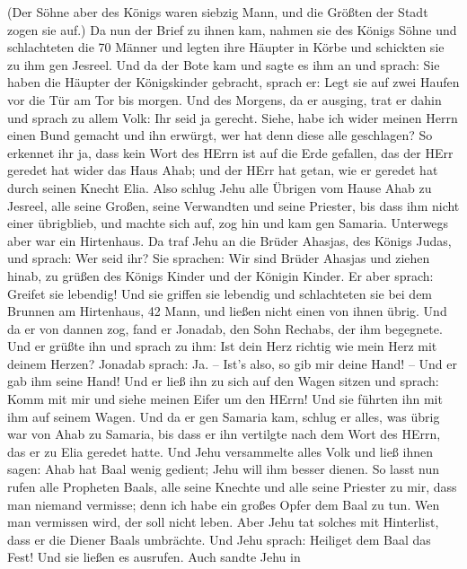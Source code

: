 (Der Söhne aber des Königs waren siebzig Mann, und die Größten der Stadt
zogen sie auf.)  Da nun der Brief zu ihnen kam, nahmen sie
des Königs Söhne und schlachteten die 70 Männer und legten ihre Häupter
in Körbe und schickten sie zu ihm gen Jesreel.  Und da der
Bote kam und sagte es ihm an und sprach: Sie haben die Häupter der
Königskinder gebracht, sprach er: Legt sie auf zwei Haufen vor die Tür
am Tor bis morgen.  Und des Morgens, da er ausging, trat er
dahin und sprach zu allem Volk: Ihr seid ja gerecht. Siehe, habe ich
wider meinen Herrn einen Bund gemacht und ihn erwürgt, wer hat denn
diese alle geschlagen?  So erkennet ihr ja, dass kein Wort
des HErrn ist auf die Erde gefallen, das der HErr geredet hat wider das
Haus Ahab; und der HErr hat getan, wie er geredet hat durch seinen
Knecht Elia.  Also schlug Jehu alle Übrigen vom Hause Ahab
zu Jesreel, alle seine Großen, seine Verwandten und seine Priester, bis
dass ihm nicht einer übrigblieb,  und machte sich auf, zog
hin und kam gen Samaria. Unterwegs aber war ein Hirtenhaus.
 Da traf Jehu an die Brüder Ahasjas, des Königs Judas, und
sprach: Wer seid ihr? Sie sprachen: Wir sind Brüder Ahasjas und ziehen
hinab, zu grüßen des Königs Kinder und der Königin Kinder. 
Er aber sprach: Greifet sie lebendig! Und sie griffen sie lebendig und
schlachteten sie bei dem Brunnen am Hirtenhaus, 42 Mann, und ließen
nicht einen von ihnen übrig.  Und da er von dannen zog,
fand er Jonadab, den Sohn Rechabs, der ihm begegnete. Und er grüßte ihn
und sprach zu ihm: Ist dein Herz richtig wie mein Herz mit deinem
Herzen? Jonadab sprach: Ja. -- Ist's also, so gib mir deine Hand! -- Und
er gab ihm seine Hand! Und er ließ ihn zu sich auf den Wagen sitzen
 und sprach: Komm mit mir und siehe meinen Eifer um den
HErrn! Und sie führten ihn mit ihm auf seinem Wagen.  Und
da er gen Samaria kam, schlug er alles, was übrig war von Ahab zu
Samaria, bis dass er ihn vertilgte nach dem Wort des HErrn, das er zu
Elia geredet hatte.  Und Jehu versammelte alles Volk und
ließ ihnen sagen: Ahab hat Baal wenig gedient; Jehu will ihm besser
dienen.  So lasst nun rufen alle Propheten Baals, alle
seine Knechte und alle seine Priester zu mir, dass man niemand vermisse;
denn ich habe ein großes Opfer dem Baal zu tun. Wen man vermissen wird,
der soll nicht leben. Aber Jehu tat solches mit Hinterlist, dass er die
Diener Baals umbrächte.  Und Jehu sprach: Heiliget dem Baal
das Fest! Und sie ließen es ausrufen.  Auch sandte Jehu in
